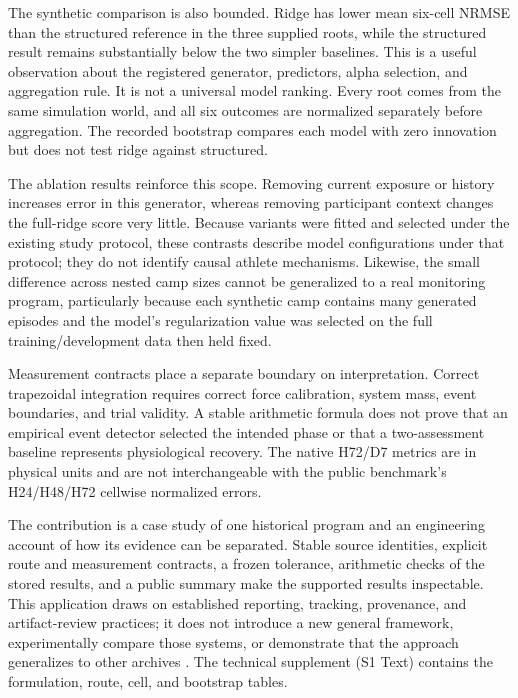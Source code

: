\documentclass[12pt,a4paper]{article}
\begin{document}
The synthetic comparison is also bounded. Ridge has lower mean six-cell NRMSE than the structured reference in the three supplied roots, while the structured result remains substantially below the two simpler baselines. This is a useful observation about the registered generator, predictors, alpha selection, and aggregation rule. It is not a universal model ranking. Every root comes from the same simulation world, and all six outcomes are normalized separately before aggregation. The recorded bootstrap compares each model with zero innovation but does not test ridge against structured.

The ablation results reinforce this scope. Removing current exposure or history increases error in this generator, whereas removing participant context changes the full-ridge score very little. Because variants were fitted and selected under the existing study protocol, these contrasts describe model configurations under that protocol; they do not identify causal athlete mechanisms. Likewise, the small difference across nested camp sizes cannot be generalized to a real monitoring program, particularly because each synthetic camp contains many generated episodes and the model's regularization value was selected on the full training/development data then held fixed.

Measurement contracts place a separate boundary on interpretation. Correct trapezoidal integration requires correct force calibration, system mass, event boundaries, and trial validity. A stable arithmetic formula does not prove that an empirical event detector selected the intended phase or that a two-assessment baseline represents physiological recovery. The native H72/D7 metrics are in physical units and are not interchangeable with the public benchmark's H24/H48/H72 cellwise normalized errors.

The contribution is a case study of one historical program and an engineering account of how its evidence can be separated. Stable source identities, explicit route and measurement contracts, a frozen tolerance, arithmetic checks of the stored results, and a public summary make the supported results inspectable. This application draws on established reporting, tracking, provenance, and artifact-review practices; it does not introduce a new general framework, experimentally compare those systems, or demonstrate that the approach generalizes to other archives \cite{R7,R9,R16,R17,R18,R19,R20}. The technical supplement (S1 Text) contains the formulation, route, cell, and bootstrap tables.
\end{document}
